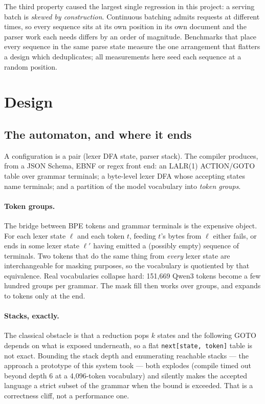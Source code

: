 \documentclass{article}
\begin{document}
The third property caused the largest single regression in this project: a
serving batch is \emph{skewed by construction}. Continuous batching admits
requests at different times, so every sequence sits at its own position in its
own document and the parser work each needs differs by an order of magnitude.
Benchmarks that place every sequence in the same parse state measure the one
arrangement that flatters a design which deduplicates; all measurements here
seed each sequence at a random position.

\section{Design}
\label{sec:design}

\subsection{The automaton, and where it ends}
\label{sec:automaton}

A configuration is a pair (lexer DFA state, parser stack). The compiler produces,
from a JSON Schema, EBNF or regex front end: an LALR(1) ACTION/GOTO table over
grammar terminals; a byte-level lexer DFA whose accepting states name terminals;
and a partition of the model vocabulary into \emph{token groups}.

\paragraph{Token groups.} The bridge between BPE tokens and grammar terminals is
the expensive object. For each lexer state $\ell$ and each token $t$, feeding
$t$'s bytes from $\ell$ either fails, or ends in some lexer state $\ell'$ having
emitted a (possibly empty) sequence of terminals. Two tokens that do the same
thing from \emph{every} lexer state are interchangeable for masking purposes, so
the vocabulary is quotiented by that equivalence. Real vocabularies collapse
hard: 151{,}669 Qwen3 tokens become a few hundred groups per grammar. The mask
fill then works over groups, and expands to tokens only at the end.

\paragraph{Stacks, exactly.} The classical obstacle is that a reduction pops
$k$ states and the following GOTO depends on what is exposed underneath, so a
flat \texttt{next[state, token]} table is not exact. Bounding the stack depth
and enumerating reachable stacks --- the approach a prototype of this system
took --- both explodes (compile timed out beyond depth 6 at a 4{,}096-token
vocabulary) and silently makes the accepted language a strict subset of the
grammar when the bound is exceeded. That is a correctness cliff, not a
performance one.
\end{document}

